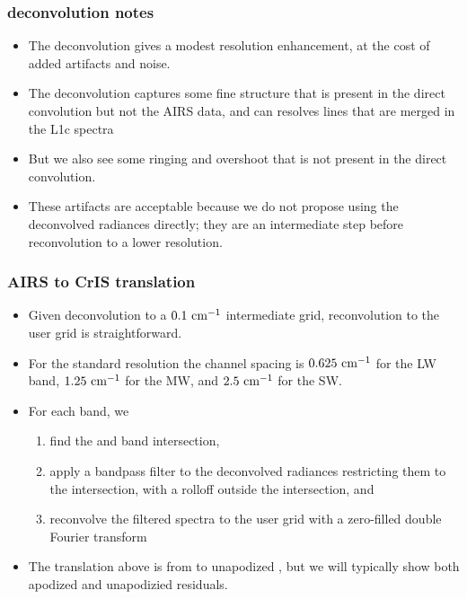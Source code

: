 \documentclass[10pt]{beamer}
\begin{document}
\begin{frame}
\frametitle{deconvolution notes}
\begin{itemize}

  \item The {\airs} deconvolution gives a modest resolution
    enhancement, at the cost of added artifacts and noise.

  \item The deconvolution captures some fine structure that is
    present in the direct convolution but not the AIRS data, and 
    can resolves lines that are merged in the {\airs} L1c spectra

  \item But we also see some ringing and overshoot that is not
    present in the direct convolution.

  \item These artifacts are acceptable because we do not propose
    using the deconvolved radiances directly; they are an
    intermediate step before reconvolution to a lower resolution.

\end{itemize}
\end{frame}
\begin{frame}
\frametitle{AIRS to CrIS translation}
\begin{itemize}

  \item Given {\airs} deconvolution to a $0.1~\mbox{cm$^{-1}$}$ intermediate
    grid, reconvolution to the {\cris} user grid is straightforward.

  \item For the {\cris} standard resolution the channel spacing is
    $0.625~\mbox{cm$^{-1}$}$ for the LW band, $1.25~\mbox{cm$^{-1}$}$ for the MW, and
    $2.5~\mbox{cm$^{-1}$}$ for the SW.

  \item For each {\cris} band, we 
    \begin{enumerate}
       \item find the {\airs} and {\cris} band intersection, 
       \item apply a bandpass filter to the deconvolved {\airs}
         radiances restricting them to the intersection, with a
         rolloff outside the intersection, and
       \item reconvolve the filtered spectra to the {\cris} user
         grid with a zero-filled double Fourier transform
    \end{enumerate}

  \item The translation above is from {\airs} to unapodized {\cris},
    but we will typically show both apodized and unapodizied residuals.

\end{itemize}
\end{frame}
\end{document}
